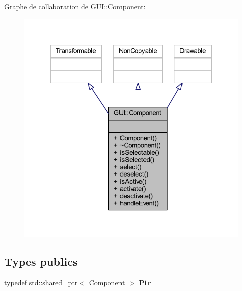 Graphe de collaboration de G\+UI\+:\+:Component\+:\nopagebreak
\begin{figure}[H]
\begin{center}
\leavevmode
\includegraphics[width=324pt]{class_g_u_i_1_1_component__coll__graph}
\end{center}
\end{figure}
\subsection*{Types publics}
\begin{DoxyCompactItemize}
\item 
\hypertarget{class_g_u_i_1_1_component_aa51eb17541f4cbe71b60cf7e1e16f32b}{}\label{class_g_u_i_1_1_component_aa51eb17541f4cbe71b60cf7e1e16f32b} 
typedef std\+::shared\+\_\+ptr$<$ \hyperlink{class_g_u_i_1_1_component}{Component} $>$ {\bfseries Ptr}
\end{DoxyCompactItemize}
